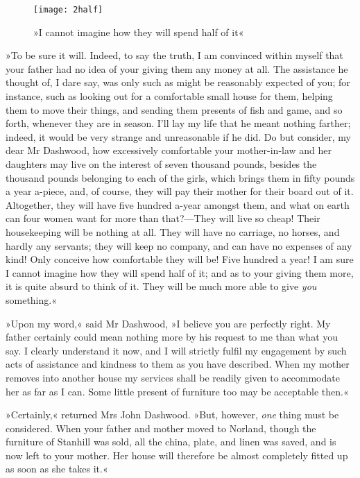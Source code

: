 \begin{figure}[t]
\centering
\texttt{[image: 2half]}
\caption{»I cannot imagine how they will spend half of it«}
\end{figure}

»To be sure it will. Indeed, to say the truth, I am convinced within myself that your father had no idea of your giving them any money at all. The assistance he thought of, I dare say, was only such as might be reasonably expected of you; for instance, such as looking out for a comfortable small house for them, helping them to move their things, and sending them presents of fish and game, and so forth, whenever they are in season. I’ll lay my life that he meant nothing farther; indeed, it would be very strange and unreasonable if he did. Do but consider, my dear Mr Dashwood, how excessively comfortable your mother-in-law and her daughters may live on the interest of seven thousand pounds, besides the thousand pounds belonging to each of the girls, which brings them in fifty pounds a year a-piece, and, of course, they will pay their mother for their board out of it. Altogether, they will have five hundred a-year amongst them, and what on earth can four women want for more than that?—They will live so cheap! Their housekeeping will be nothing at all. They will have no carriage, no horses, and hardly any servants; they will keep no company, and can have no expenses of any kind! Only conceive how comfortable they will be! Five hundred a year! I am sure I cannot imagine how they will spend half of it; and as to your giving them more, it is quite absurd to think of it. They will be much more able to give \textit{you} something.«



»Upon my word,« said Mr Dashwood, »I believe you are perfectly right. My father certainly could mean nothing more by his request to me than what you say. I clearly understand it now, and I will strictly fulfil my engagement by such acts of assistance and kindness to them as you have described. When my mother removes into another house my services shall be readily given to accommodate her as far as I can. Some little present of furniture too may be acceptable then.«

»Certainly,« returned Mrs John Dashwood. »But, however, \textit{one} thing must be considered. When your father and mother moved to Norland, though the furniture of Stanhill was sold, all the china, plate, and linen was saved, and is now left to your mother. Her house will therefore be almost completely fitted up as soon as she takes it.«

